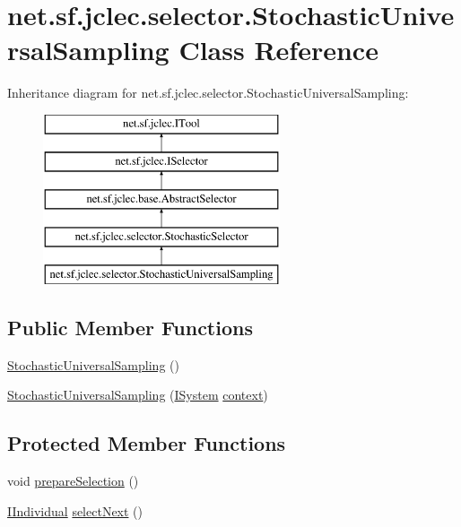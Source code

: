 \hypertarget{classnet_1_1sf_1_1jclec_1_1selector_1_1_stochastic_universal_sampling}{\section{net.\-sf.\-jclec.\-selector.\-Stochastic\-Universal\-Sampling Class Reference}
\label{classnet_1_1sf_1_1jclec_1_1selector_1_1_stochastic_universal_sampling}
}
Inheritance diagram for net.\-sf.\-jclec.\-selector.\-Stochastic\-Universal\-Sampling\-:\begin{figure}[H]
\begin{center}
\leavevmode
\includegraphics[height=5.000000cm]{classnet_1_1sf_1_1jclec_1_1selector_1_1_stochastic_universal_sampling}
\end{center}
\end{figure}
\subsection*{Public Member Functions}
\begin{DoxyCompactItemize}
\item 
\hyperlink{classnet_1_1sf_1_1jclec_1_1selector_1_1_stochastic_universal_sampling_a7e17f8a4ee729b6e69ec2b0d4619a6a3}{Stochastic\-Universal\-Sampling} ()
\item 
\hyperlink{classnet_1_1sf_1_1jclec_1_1selector_1_1_stochastic_universal_sampling_ad06aa69c513ea790470a95b9b486367c}{Stochastic\-Universal\-Sampling} (\hyperlink{interfacenet_1_1sf_1_1jclec_1_1_i_system}{I\-System} \hyperlink{classnet_1_1sf_1_1jclec_1_1base_1_1_abstract_selector_a4304fe5c27aa7631dc91678d22473b94}{context})
\end{DoxyCompactItemize}
\subsection*{Protected Member Functions}
\begin{DoxyCompactItemize}
\item 
void \hyperlink{classnet_1_1sf_1_1jclec_1_1selector_1_1_stochastic_universal_sampling_a96de01df1c80595d744f3c706699d927}{prepare\-Selection} ()
\item 
\hyperlink{interfacenet_1_1sf_1_1jclec_1_1_i_individual}{I\-Individual} \hyperlink{classnet_1_1sf_1_1jclec_1_1selector_1_1_stochastic_universal_sampling_a98f656114c234fdc5ddcf8e532bebe22}{select\-Next} ()
\end{DoxyCompactItemize}
